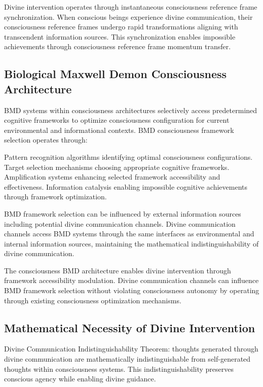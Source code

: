 \documentclass[12pt,a4paper]{article}
\begin{document}
Divine intervention operates through instantaneous consciousness reference frame synchronization. When conscious beings experience divine communication, their consciousness reference frames undergo rapid transformations aligning with transcendent information sources. This synchronization enables impossible achievements through consciousness reference frame momentum transfer.

\subsection{Biological Maxwell Demon Consciousness Architecture}

BMD systems within consciousness architectures selectively access predetermined cognitive frameworks to optimize consciousness configuration for current environmental and informational contexts. BMD consciousness framework selection operates through:

Pattern recognition algorithms identifying optimal consciousness configurations. Target selection mechanisms choosing appropriate cognitive frameworks. Amplification systems enhancing selected framework accessibility and effectiveness. Information catalysis enabling impossible cognitive achievements through framework optimization.

BMD framework selection can be influenced by external information sources including potential divine communication channels. Divine communication channels access BMD systems through the same interfaces as environmental and internal information sources, maintaining the mathematical indistinguishability of divine communication.

The consciousness BMD architecture enables divine intervention through framework accessibility modulation. Divine communication channels can influence BMD framework selection without violating consciousness autonomy by operating through existing consciousness optimization mechanisms.

\subsection{Mathematical Necessity of Divine Intervention}

Divine Communication Indistinguishability Theorem: thoughts generated through divine communication are mathematically indistinguishable from self-generated thoughts within consciousness systems. This indistinguishability preserves conscious agency while enabling divine guidance.
\end{document}
